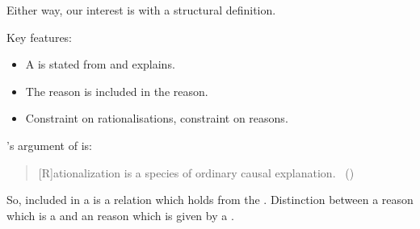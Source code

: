 \begin{note}
{    Either way, our interest is with a structural definition.
  }

  Key features:

  \begin{itemize}
  \item
    A \rationalisation{} is stated from  and explains.
  \item
    The \agents{} reason is included in the reason.
  \item
    Constraint on rationalisations, constraint on \agents{} reasons.
  \end{itemize}

  \citeauthor{Davidson:1963aa}'s argument of  is:
  \begin{quote}
    [R]ationalization is a species of ordinary causal explanation.%
    \mbox{ }\hfill\mbox{(\citeyear[685]{Davidson:1963aa})}
  \end{quote}

  So, included in a  is a relation which holds from the \agpe{}.
  Distinction between a reason which is a  and an \agents{} reason which is given by a .
\end{note}


